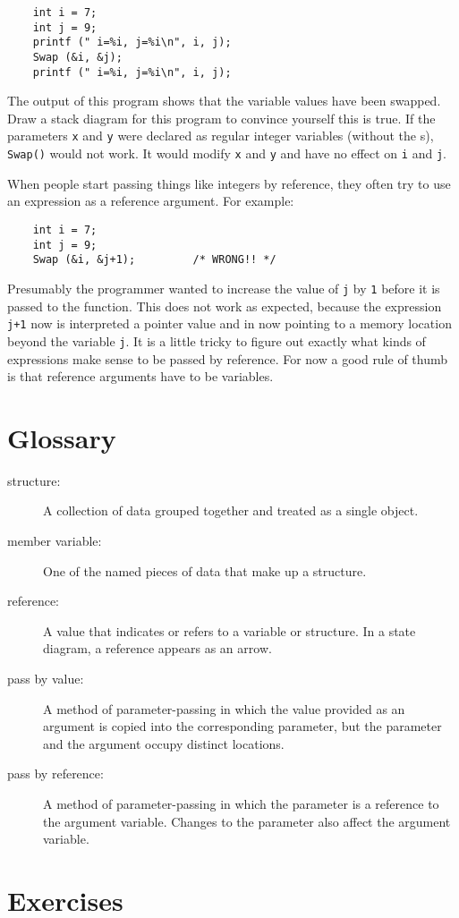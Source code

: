 \begin{verbatim}
	int i = 7;
	int j = 9;
	printf (" i=%i, j=%i\n", i, j);
	Swap (&i, &j);
	printf (" i=%i, j=%i\n", i, j);
\end{verbatim}
%
The output of this program shows that the variable
values have been swapped.  Draw a stack
diagram for this program to convince yourself this is true.
If the parameters {\tt x} and {\tt y} were declared as
regular integer variables (without the {\tt \*}s), {\tt Swap()} would
not work.  It would modify {\tt x} and {\tt y} and have no
effect on {\tt i} and {\tt j}.

When people start passing things like integers by reference,
they often try to use an expression
as a reference argument.  For example:

\begin{verbatim}
	int i = 7;
	int j = 9;
	Swap (&i, &j+1);         /* WRONG!! */
\end{verbatim}
%
Presumably the programmer wanted to increase the value of {\tt j} by {\tt 1}
before it is passed to the function.
This does not work as expected, because the expression {\tt j+1} now
is interpreted a pointer value and in now pointing to a memory
location beyond the variable {\tt j}. 
It is a little tricky to figure out exactly
what kinds of expressions make sense to be passed by reference.  For now
a good rule of thumb is that reference arguments have to be
variables.


\section{Glossary}

\begin{description}
	
	\item[structure:]  A collection of data grouped together and
	treated as a single object.
	
	\item[member variable:]  One of the named pieces of data that make up
	a structure.
	
	\item[reference:]  A value that indicates or refers to a variable
	or structure.  In a state diagram, a reference appears as an arrow.
	
	\item[pass by value:]  A method of parameter-passing in which the
	value provided as an argument is copied into the corresponding
	parameter, but the parameter and the argument occupy distinct
	locations.
	
	\item[pass by reference:]  A method of parameter-passing in which
	the parameter is a reference to the argument variable.  Changes
	to the parameter also affect the argument variable.
	
	
\end{description}

\section{Exercises}
\setcounter{exercisenum}{0}




